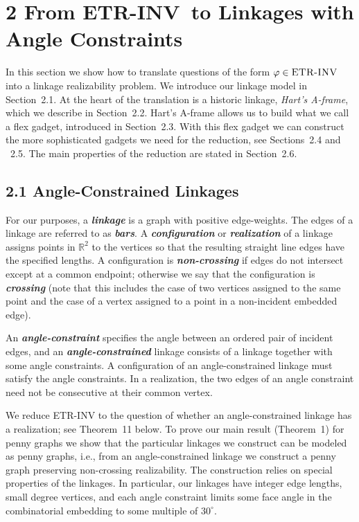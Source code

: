 \documentclass{article}
\newcommand{\defn}[1]{\textit{\textbf{\boldmath #1}}}
\begin{document}
\section*{2 From \textnormal{\textsc{ETR-INV}}\ to Linkages with Angle Constraints}

In this section we show how to translate questions of the form $\varphi \in \textnormal{\textsc{ETR-INV}}$ into a linkage realizability problem. We introduce our linkage model in Section~2.1. At the heart of the translation is a historic linkage, {\em Hart's A-frame}, which we describe in Section~2.2. Hart's A-frame allows us to build what we call a flex gadget, introduced in Section~2.3. With this flex gadget we can construct the more sophisticated gadgets we need for the reduction, see Sections~2.4 and ~2.5. The main properties of the reduction are stated in Section~2.6.

\subsection*{2.1 Angle-Constrained Linkages}

For our purposes, a \defn{linkage} is a graph with positive edge-weights. 
The edges of a linkage are referred to as \defn{bars}.
A \defn{configuration} or \defn{realization} of a linkage assigns 
points in $\mathbb{R}^2$ 
to the vertices so that the resulting straight line edges have the specified lengths. 
A configuration is \defn{non-crossing} if edges do not intersect except at a common endpoint; otherwise we say that the configuration is \defn{crossing} (note that this
includes the case
of two vertices assigned to the same point and the case of a vertex assigned to a point in a non-incident embedded edge).

An \defn{angle-constraint} specifies the angle between an ordered pair of incident edges, and 
an \defn{angle-constrained} 
linkage consists of a linkage together with some angle constraints.
A configuration of an angle-constrained linkage must satisfy the angle constraints.
In a realization, 
the  two edges of an angle constraint
need not be consecutive at their common vertex.

We reduce \textnormal{\textsc{ETR-INV}} to the question of whether an angle-constrained linkage has a realization; see Theorem~11 below. 
To prove our main result (Theorem~1) for penny graphs we show that the particular linkages we construct can be modeled as penny graphs, i.e., from an angle-constrained linkage we construct a penny graph preserving non-crossing realizability.
The construction relies on special properties of the linkages.
In particular, our linkages have
integer edge lengths, small degree vertices, and each angle constraint limits some face angle in the combinatorial embedding to some multiple of $30^\circ$.
\end{document}
